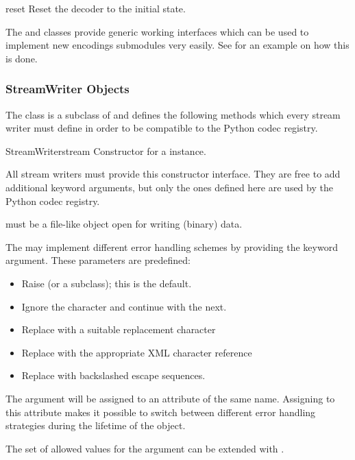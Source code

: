 \begin{methoddesc}{reset}{}
  Reset the decoder to the initial state.
\end{methoddesc}


The  and  classes provide
generic working interfaces which can be used to implement new
encodings submodules very easily. See  for an
example on how this is done.


\subsubsection{StreamWriter Objects \label{stream-writer-objects}}

The  class is a subclass of  and
defines the following methods which every stream writer must define in
order to be compatible to the Python codec registry.

\begin{classdesc}{StreamWriter}{stream}
  Constructor for a  instance. 

  All stream writers must provide this constructor interface. They are
  free to add additional keyword arguments, but only the ones defined
  here are used by the Python codec registry.

   must be a file-like object open for writing (binary)
  data.

  The  may implement different error handling
  schemes by providing the  keyword argument. These
  parameters are predefined:

  \begin{itemize}
    \item {} Raise  (or a subclass);
                          this is the default.
    \item {} Ignore the character and continue with the next.
    \item {} Replace with a suitable replacement character
    \item {} Replace with the appropriate XML
                     character reference
    \item {} Replace with backslashed escape sequences.
  \end{itemize}

  The  argument will be assigned to an attribute of the
  same name. Assigning to this attribute makes it possible to switch
  between different error handling strategies during the lifetime
  of the  object.

  The set of allowed values for the  argument can
  be extended with .
\end{classdesc}

